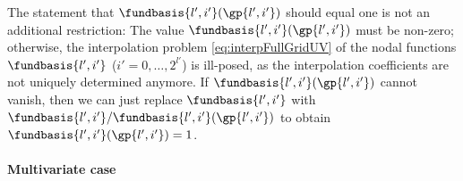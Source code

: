 The statement that $\fundbasis{l',i'}(\gp{l',i'})$ should equal one
is not an additional restriction:
The value $\fundbasis{l',i'}(\gp{l',i'})$ must be non-zero;
otherwise, the interpolation problem \eqref{eq:interpFullGridUV}
of the nodal functions $\fundbasis{l',i'}$ ($i' = 0, \dotsc, 2^{l'}$)
is ill-posed, as the interpolation coefficients are not uniquely
determined anymore.
If $\fundbasis{l',i'}(\gp{l',i'})$ cannot vanish,
then we can just replace $\fundbasis{l',i'}$ with
$\fundbasis{l',i'}/\fundbasis{l',i'}(\gp{l',i'})$ to obtain
$\fundbasis{l',i'}(\gp{l',i'}) = 1$.

%

\paragraph{Multivariate case}


